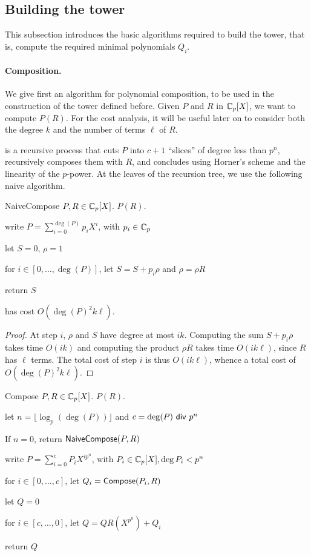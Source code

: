 

\subsection{Building the tower}

This subsection introduces the basic algorithms required to build the
tower, that is, compute the required minimal polynomials $Q_i$.

\paragraph*{\bf Composition.} We give first an algorithm for
polynomial composition, to be used in the construction of the tower
defined before.  Given $P$ and $R$ in $\mathbb{C}_p[X]$, we want to compute
$P(R)$. For the cost analysis, it will be useful later on to consider
both the degree $k$ and the number of terms $\ell$ of $R$.

 is a recursive process that cuts $P$ into $c+1$
``slices'' of degree less than $p^n$, recursively composes them with
$R$, and concludes using Horner's scheme and the linearity of the
$p$-power. At the leaves of the recursion tree, we use the following naive
algorithm.

\begin{algorithm}
  {NaiveCompose}
  {$P,R\in\mathbb{C}_p[X]$.}
  {$P(R)$.}
\item write $P=\sum_{i=0}^{\deg(P)} p_i X^{i}$, with $p_i \in \mathbb{C}_p$
\item let $S=0$, $\rho=1$
\item for $i\in [0,\dots,\deg(P)]$, let $S=S+p_i \rho$ and $\rho =\rho R$
\item return $S$
\end{algorithm}

\begin{lemma}
   has cost $O(\deg(P)^2k\ell)$.  
\end{lemma}
\begin{proof} At step $i$, $\rho$ and $S$ have degree at most
$ik$. Computing the sum $S + p_i \rho$ takes time $O(ik)$ and
computing the product $\rho R$ takes time $O(ik\ell)$, since $R$ has
$\ell$ terms. The total cost of step $i$ is thus $O(ik\ell)$, 
whence a total cost of $O(\deg(P)^2 k\ell)$.
\end{proof}


\begin{algorithm}
  {Compose}
  {$P,R\in\mathbb{C}_p[X]$.}
  {$P(R)$.}
\item\label{c:params} let $n=\lfloor \log_p(\deg(P)) \rfloor$ and $c=\deg(P) {\sf~div~} p^n$
\item If $n=0$, return ${\sf NaiveCompose}(P,R)$
\item write $P=\sum_{i=0}^{c} P_i X^{ip^n}$, with $P_i \in \mathbb{C}_p[X], \deg P_i<p^n$
\item for $i\in [0,\dots,c]$, let $Q_i = \text{{\sf Compose}}(P_i,R)$
\item let $Q=0$
\item\label{c:loop} for $i\in [c,\dots,0]$, let $Q = Q R(X^{p^n})  + Q_i$
\item return $Q$
\end{algorithm}

